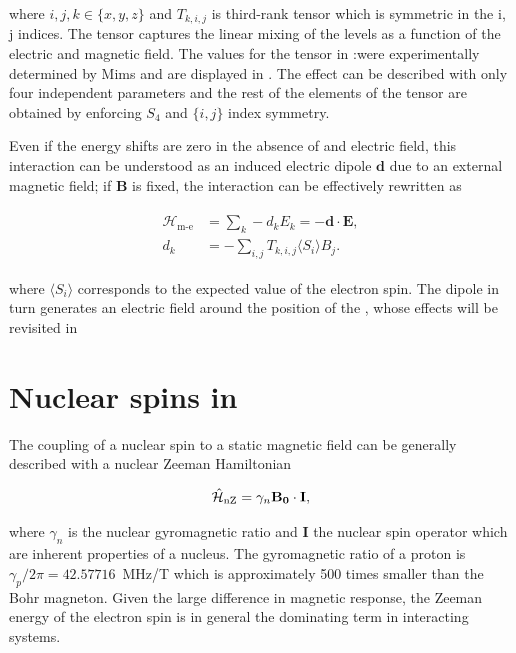 where $i,j,k \in\{x,y,z\}$ and $T_{k, i, j}$ is third-rank tensor which is symmetric in the {i, j} indices. The tensor captures the linear mixing of the levels as a function of the electric and magnetic field. The values for the tensor in \Er:\Ca were experimentally determined by Mims  and are displayed in . The effect can be described with only four independent parameters and the rest of the elements of the tensor are obtained by enforcing $S_4$ and $\{i, j\}$ index symmetry.

Even if the energy shifts are zero in the absence of and electric field, this interaction can be understood as an induced electric dipole $\mathbf{d}$ due to an external magnetic field; if $\mathbf{B}$ is fixed, the interaction can be effectively rewritten as 

\begin{align}
\begin{split}
    \mathcal{H}_{\text{m-e}} &= \sum_k-d_k E_k = -\mathbf{d} \cdot \mathbf{E}, \\
    d_k &= - \sum_{i,j} T_{k, i, j} \langle S_{i}\rangle B_j.
\end{split}
\label{seq:electric_dipole}
\end{align}

where $\langle S_i \rangle$ corresponds to the expected value of the electron spin. The dipole in turn generates an electric field around the position of the \Er, whose effects will be revisited in 


\section[Nuclear spins in CaWO4]{Nuclear spins in \Ca}

The coupling of a nuclear spin to a static magnetic field can be generally described with a nuclear Zeeman Hamiltonian

\begin{equation}
    \hat{\mathcal{H}}_{\text{nZ}} = \gamma_n \mathbf{B_0}\cdot\mathbf{I},
\end{equation}

\noindent where $\gamma_n$ is the nuclear gyromagnetic ratio and $\mathbf{I}$ the nuclear spin operator which are inherent properties of a nucleus. The gyromagnetic ratio of a proton is $\gamma_p/2\pi = 42.57716$~MHz/T  which is approximately 500 times smaller than the Bohr magneton. Given the large difference in magnetic response, the Zeeman energy of the electron spin is in general the dominating term in interacting systems. 

